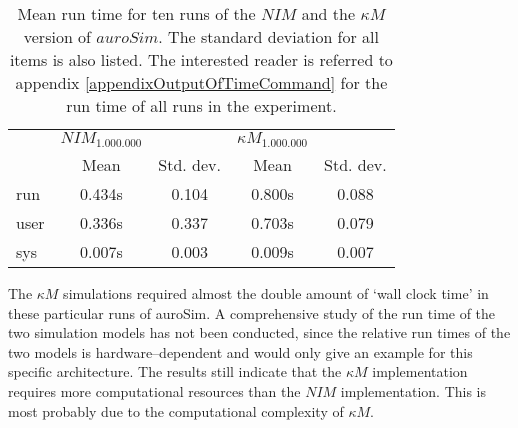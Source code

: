 	\begin{table}[hbp!t]
		\centering
		\begin{tabular}{|l|cc|cc|}
			\hline 
			& $NIM_{1.000.000}$ &  & $\kappa M_{1.000.000}$ & \\
			& Mean & Std. dev. & Mean & Std. dev.  \\
			\hline
			run 	& 0.434s 	& 	0.104 	& 0.800s 	& 0.088 \\
			user 	& 0.336s 	&	0.337 	& 0.703s  & 0.079 \\
			sys 	& 0.007s 	& 	0.003	& 0.009s  & 0.007
			\\ \hline 
		\end{tabular}
		\caption[Mean run time for ten runs of the $NIM$ and $\kappa M$ version of $auroSim$]{
			Mean run time for ten runs of the $NIM$ and the $\kappa M$ version of $auroSim$.
			The standard deviation for all items is also listed.
			The interested reader is referred to appendix \ref{appendixOutputOfTimeCommand} for the run time of all runs in the experiment.
			}
		\label{tabRunTimesForImplementationOfSANNandKM}
	\end{table}


		The $\kappa M$ simulations required almost the double amount of `wall clock time' in these particular runs of auroSim.
		A comprehensive study of the run time of the two simulation models has not been conducted, since the relative run times of the two models is hardware--dependent and would only give an example for this specific architecture.
		The results still indicate that the $\kappa M$ implementation requires more computational resources than the $NIM$ implementation.
		This is most probably due to the computational complexity of $\kappa M$.




